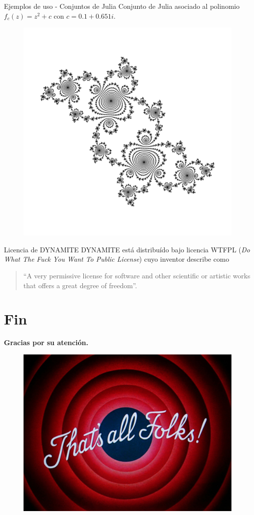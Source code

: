 \documentclass{beamer}
\newcommand{\stframe}[1]{\begin{frame} \begin{center}\Large{\textbf{{#1}}}\end{center}\end{frame}}
\begin{document}
\begin{frame}{Ejemplos de uso - Conjuntos de Julia}
Conjunto de Julia asociado al polinomio $f_c(z) = z^2 + c$ con $c = 0.1 + 0.651i$.
\begin{figure}[!ht] \centering
 \includegraphics[scale=0.1]{figures/juliaset.png}
\end{figure}
\end{frame}

\begin{frame}{Licencia de DYNAMITE}
DYNAMITE está distribuído bajo licencia WTFPL (\textit{Do What The Fuck You Want To Public License}) cuyo inventor describe como
\begin{quote}``A very permissive license for software and other scientific or artistic works that offers a great degree of freedom''.
\end{quote}
\end{frame}

\section{Fin}
\stframe{Gracias por su atención.}

\begin{frame}
\begin{figure} \centering
\includegraphics[scale=0.2]{figures/thats-all-folks.jpg}
\end{figure}
\end{frame}
\end{document}
